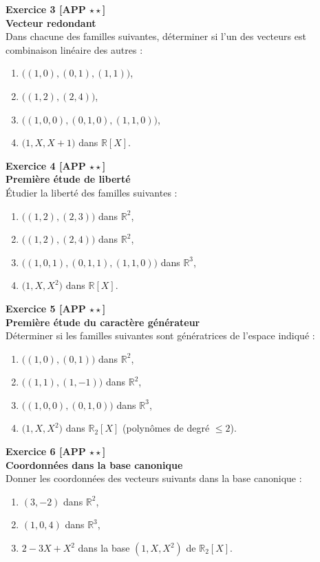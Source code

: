\documentclass[11pt,a4paper]{article}
\begin{document}
\textbf{Exercice 3 [APP $\star\star$]}\\
\textbf{Vecteur redondant}\\
Dans chacune des familles suivantes, déterminer si l’un des vecteurs est combinaison linéaire des autres :
\begin{enumerate}[label=\alph*)]
    \item \(\big((1,0),(0,1),(1,1)\big)\),
    \item \(\big((1,2),(2,4)\big)\),
    \item \(\big((1,0,0),(0,1,0),(1,1,0)\big)\),
    \item \(\big(1,X,X+1\big)\) dans \(\mathbb{R}[X]\).
\end{enumerate}

\textbf{Exercice 4 [APP $\star\star$]}\\
\textbf{Première étude de liberté}\\
Étudier la liberté des familles suivantes :
\begin{enumerate}[label=\alph*)]
    \item \(\big((1,2),(2,3)\big)\) dans \(\mathbb{R}^2\),
    \item \(\big((1,2),(2,4)\big)\) dans \(\mathbb{R}^2\),
    \item \(\big((1,0,1),(0,1,1),(1,1,0)\big)\) dans \(\mathbb{R}^3\),
    \item \(\big(1,X,X^2\big)\) dans \(\mathbb{R}[X]\).
\end{enumerate}

\textbf{Exercice 5 [APP $\star\star$]}\\
\textbf{Première étude du caractère générateur}\\
Déterminer si les familles suivantes sont génératrices de l’espace indiqué :
\begin{enumerate}[label=\alph*)]
    \item \(\big((1,0),(0,1)\big)\) dans \(\mathbb{R}^2\),
    \item \(\big((1,1),(1,-1)\big)\) dans \(\mathbb{R}^2\),
    \item \(\big((1,0,0),(0,1,0)\big)\) dans \(\mathbb{R}^3\),
    \item \(\big(1,X,X^2\big)\) dans \(\mathbb{R}_2[X]\) (polynômes de degré \(\le 2\)).
\end{enumerate}

\textbf{Exercice 6 [APP $\star\star$]}\\
\textbf{Coordonnées dans la base canonique}\\
Donner les coordonnées des vecteurs suivants dans la base canonique :
\begin{enumerate}[label=\alph*)]
    \item \((3,-2)\) dans \(\mathbb{R}^2\),
    \item \((1,0,4)\) dans \(\mathbb{R}^3\),
    \item \(2-3X+X^2\) dans la base \((1,X,X^2)\) de \(\mathbb{R}_2[X]\).
\end{enumerate}
\end{document}
